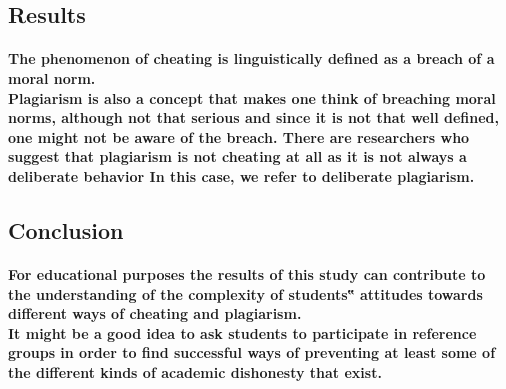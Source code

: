 \documentclass[11pt]{article}
\begin{document}
	   \subsection{Results}
	   \paragraph{The phenomenon of cheating is linguistically defined as a breach of a moral norm.\\ Plagiarism is also a concept that makes one think of breaching moral norms, although not that serious and since it is not that well defined, one might not be aware of the breach. There are researchers who suggest that plagiarism is not cheating at all as it is not always a deliberate behavior In this case, we refer to deliberate plagiarism.}
	   
	   \subsection{ Conclusion}
	   \paragraph{For educational purposes the results of this study can contribute to the understanding of the complexity of students‟ attitudes towards different ways of cheating and plagiarism. \\It might be a good idea to ask students to participate in reference groups in order to find successful ways of preventing at least some of the different kinds of academic dishonesty that exist.}
	   
	
    	
    	
\end{document}
